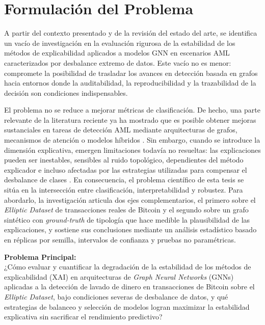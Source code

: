 \bigskip

\section{Formulación del Problema}

A partir del contexto presentado y de la revisión del estado del arte, se identifica un vacío de investigación en la evaluación rigurosa de la estabilidad de los métodos de explicabilidad aplicados a modelos GNN en escenarios AML caracterizados por desbalance extremo de datos. Este vacío no es menor: compromete la posibilidad de trasladar los avances en detección basada en grafos hacia entornos donde la auditabilidad, la reproducibilidad y la trazabilidad de la decisión son condiciones indispensables.

\bigskip

El problema no se reduce a mejorar métricas de clasificación. De hecho, una parte relevante de la literatura reciente ya ha mostrado que es posible obtener mejoras sustanciales en tareas de detección AML mediante arquitecturas de grafos, mecanismos de atención o modelos híbridos \cite{Lawal2025AnDataset, Wan2024AMemory, Lin2026DetectingLaundering}. Sin embargo, cuando se introduce la dimensión explicativa, emergen limitaciones todavía no resueltas: las explicaciones pueden ser inestables, sensibles al ruido topológico, dependientes del método explicador e incluso afectadas por las estrategias utilizadas para compensar el desbalance de clases \cite{Gawantka2024AExplanations, Rai2025EvaluatingData, Fujiwara2024KnowledgeStability}. En consecuencia, el problema científico de esta tesis se sitúa en la intersección entre clasificación, interpretabilidad y robustez. Para abordarlo, la investigación articula dos ejes complementarios, el primero sobre el \textit{Elliptic Dataset} de transacciones reales de Bitcoin y el segundo sobre un grafo sintético con \textit{ground-truth} de tipología que hace medible la plausibilidad de las explicaciones, y sostiene sus conclusiones mediante un análisis estadístico basado en réplicas por semilla, intervalos de confianza y pruebas no paramétricas.

\bigskip

\textbf{Problema Principal:}\\
¿Cómo evaluar y cuantificar la degradación de la estabilidad de los métodos de explicabilidad (XAI) en arquitecturas de \textit{Graph Neural Networks} (GNNs) aplicadas a la detección de lavado de dinero en transacciones de Bitcoin sobre el \textit{Elliptic Dataset}, bajo condiciones severas de desbalance de datos, y qué estrategias de balanceo y selección de modelos logran maximizar la estabilidad explicativa sin sacrificar el rendimiento predictivo?

